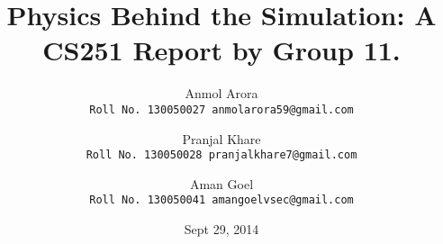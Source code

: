 \documentclass[]{beamer}%
\title{Physics Behind the Simulation: A CS251 Report by Group 11.}
\author{
	Anmol Arora \\
   \texttt{Roll No. 130050027
    anmolarora59@gmail.com}\\
\and
Pranjal Khare \\
    \texttt{Roll No. 130050028 
    pranjalkhare7@gmail.com}\\
\and
Aman Goel \\
    \texttt{Roll No. 130050041 
    amangoelvsec@gmail.com}\\
}
\date{Sept 29, 2014}
\begin{document}
\begin{frame}
\titlepage
\end{frame}






\end{document}
